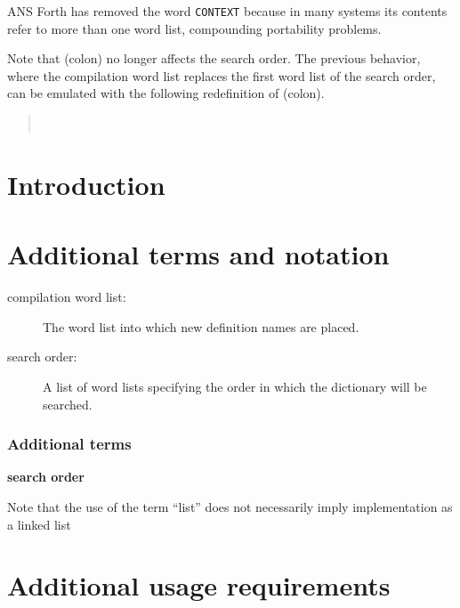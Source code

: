 \begin{intro}
ANS Forth has removed the word \texttt{CONTEXT} because in many systems
its contents refer to more than one word list, compounding portability
problems.

Note that \word{:} (colon) no longer affects the search order. The
previous behavior, where the compilation word list replaces the first
word list of the search order, can be emulated with the following
redefinition of \word{:} (colon).

\begin{quote}\ttfamily
	\word{:} \word{:}   
		~  ~
		  \word{:}
	\word{;}
\end{quote}
\end{intro}

\section{Introduction} %

\section{Additional terms and notation} %

\begin{description}
\item[compilation word list:]
	The word list into which new definition names are placed.

\item[search order:]
	A list of word lists specifying the order in which the
	dictionary will be searched.
\end{description}

\begin{intro}
\subsubsection{Additional terms} %

\textbf{search order}

Note that the use of the term ``list'' does not necessarily imply
implementation as a linked list
\end{intro}

\section{Additional usage requirements} %

